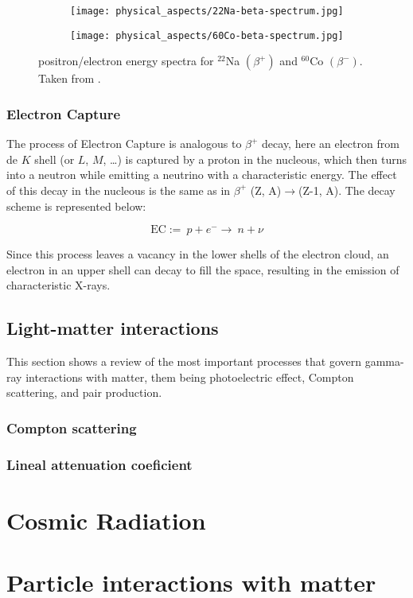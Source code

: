 \begin{figure}[H]
    \centering
    \begin{subfigure}[t]{0.45\textwidth}
      \texttt{[image: physical\_aspects/22Na-beta-spectrum.jpg]}
      \caption{\label{sfig:22Na_beta_spectra}}
    \end{subfigure}
    \begin{subfigure}[t]{0.45\textwidth}
      \texttt{[image: physical\_aspects/60Co-beta-spectrum.jpg]}
      \caption{\label{sfig:60Co_beta_spectra}}
    \end{subfigure}
    \caption{\label{fig:beta_spectra}positron/electron energy spectra for   $^{22}$Na $(\beta^+)$ and   $^{60}$Co $(\beta^-)$. Taken from \cite{IAEA}.}
\end{figure}

\subsubsection{Electron Capture}

The process of Electron Capture is analogous to $\beta^+$ decay, here an electron from de $K$ shell (or $L$, $M$, \dots) is captured by a proton in the nucleous, which then turns into a neutron while emitting a neutrino with a characteristic energy. The effect of this decay in the nucleous is the same as in $\beta^+$ (Z, A)$\rightarrow$(Z-1, A). The decay scheme is represented below:

\begin{equation}
  \text{EC} :=~ p + e^- \rightarrow ~ n + \nu
\end{equation}

Since this process leaves a vacancy in the lower shells of the electron cloud, an electron in an upper shell can decay to fill the space, resulting in the emission of characteristic X-rays.

\subsection{Light-matter interactions}

This section shows a review of the most important processes that govern gamma-ray interactions with matter, them being photoelectric effect, Compton scattering, and pair production.

\subsubsection{Compton scattering}

\subsubsection{Lineal attenuation coeficient}

\section{Cosmic Radiation}

\section{Particle interactions with matter}